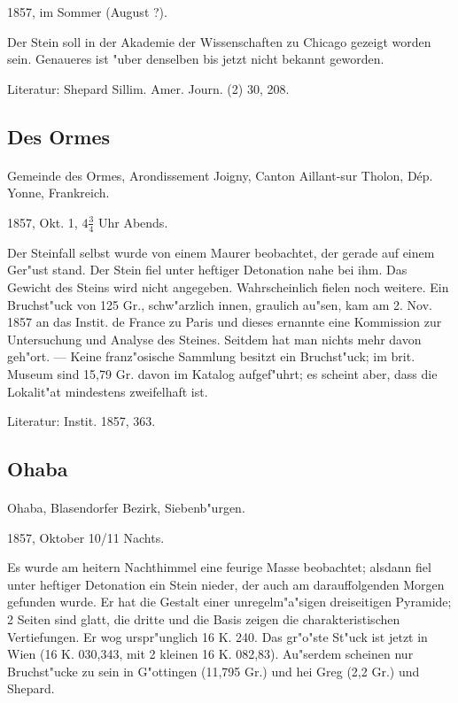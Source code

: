 \documentclass[a4paper, 11pt, oneside]{article}
\begin{document}
1857, im Sommer (August ?).

Der Stein soll in der Akademie der Wissenschaften zu Chicago gezeigt worden sein. Genaueres ist "uber denselben bis jetzt nicht bekannt geworden.

\footnotesize
Literatur: Shepard Sillim. Amer. Journ. (2) 30, 208.

\subsection{Des Ormes}
\normalsize
\paragraph{}
Gemeinde des Ormes, Arondissement Joigny, Canton Aillant-sur Tholon, Dép. Yonne, Frankreich.

1857, Okt. 1, $4\frac{3}{4}$ Uhr Abends.

Der Steinfall selbst wurde von einem Maurer beobachtet, der gerade auf einem Ger"ust stand. Der Stein fiel unter heftiger Detonation nahe bei ihm. Das Gewicht des Steins wird nicht angegeben. Wahrscheinlich fielen noch weitere. Ein Bruchst"uck von 125 Gr., schw"arzlich innen, graulich au"sen, kam am 2. Nov. 1857 an das Instit. de France zu Paris und dieses ernannte eine Kommission zur Untersuchung und Analyse des Steines. Seitdem hat man nichts mehr davon geh"ort. --- Keine franz"osische Sammlung besitzt ein Bruchst"uck; im brit. Museum sind 15,79 Gr. davon im Katalog aufgef"uhrt; es scheint aber, dass die Lokalit"at mindestens zweifelhaft ist.

\footnotesize
Literatur: Instit. 1857, 363.

\subsection{Ohaba}
\normalsize
\paragraph{}
Ohaba, Blasendorfer Bezirk, Siebenb"urgen.

1857, Oktober 10/11 Nachts.

Es wurde am heitern Nachthimmel eine feurige Masse beobachtet; alsdann fiel unter heftiger Detonation ein Stein nieder, der auch am darauffolgenden Morgen gefunden wurde. Er hat die Gestalt einer unregelm"a"sigen dreiseitigen Pyramide; 2 Seiten sind glatt, die dritte und die Basis zeigen die charakteristischen Vertiefungen. Er wog urspr"unglich 16 K. 240. Das gr"o"ste St"uck ist jetzt in Wien (16 K. 030,343, mit 2 kleinen 16 K. 082,83). Au"serdem scheinen nur Bruchst"ucke zu sein in G"ottingen (11,795 Gr.) und hei Greg (2,2 Gr.) und Shepard.
\end{document}
